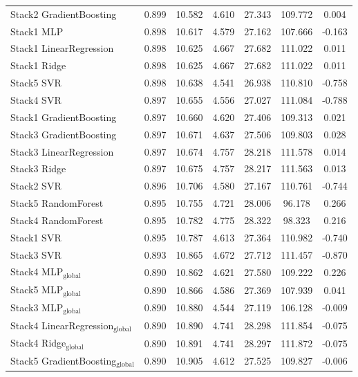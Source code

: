 \begin{table}[tp]
{\begin{tabular}{p{4.5cm}cccccc}
        Stack2 GradientBoosting & 0.899 & 10.582 & 4.610 & 27.343 & 109.772 & 0.004 \\
        Stack1 MLP & 0.898 & 10.617 & 4.579 & 27.162 & 107.666 & -0.163 \\
        Stack1 LinearRegression & 0.898 & 10.625 & 4.667 & 27.682 & 111.022 & 0.011 \\
        Stack1 Ridge & 0.898 & 10.625 & 4.667 & 27.682 & 111.022 & 0.011 \\
        Stack5 SVR & 0.898 & 10.638 & 4.541 & 26.938 & 110.810 & -0.758 \\
        Stack4 SVR & 0.897 & 10.655 & 4.556 & 27.027 & 111.084 & -0.788 \\
        Stack1 GradientBoosting & 0.897 & 10.660 & 4.620 & 27.406 & 109.313 & 0.021 \\
        Stack3 GradientBoosting & 0.897 & 10.671 & 4.637 & 27.506 & 109.803 & 0.028 \\
        Stack3 LinearRegression & 0.897 & 10.674 & 4.757 & 28.218 & 111.578 & 0.014 \\
        Stack3 Ridge & 0.897 & 10.675 & 4.757 & 28.217 & 111.563 & 0.013 \\
        Stack2 SVR & 0.896 & 10.706 & 4.580 & 27.167 & 110.761 & -0.744 \\
        Stack5 RandomForest & 0.895 & 10.755 & 4.721 & 28.006 & 96.178 & 0.266 \\
        Stack4 RandomForest & 0.895 & 10.782 & 4.775 & 28.322 & 98.323 & 0.216 \\
        Stack1 SVR & 0.895 & 10.787 & 4.613 & 27.364 & 110.982 & -0.740 \\
        Stack3 SVR & 0.893 & 10.865 & 4.672 & 27.712 & 111.457 & -0.870 \\
        Stack4 MLP$_{\text{global}}$ & 0.890 & 10.862 & 4.621 & 27.580 & 109.222 & 0.226 \\
        Stack5 MLP$_{\text{global}}$ & 0.890 & 10.866 & 4.586 & 27.369 & 107.939 & 0.041 \\
        Stack3 MLP$_{\text{global}}$ & 0.890 & 10.880 & 4.544 & 27.119 & 106.128 & -0.009 \\
        Stack4 LinearRegression$_{\text{global}}$ & 0.890 & 10.890 & 4.741 & 28.298 & 111.854 & -0.075 \\
        Stack4 Ridge$_{\text{global}}$ & 0.890 & 10.891 & 4.741 & 28.297 & 111.872 & -0.075 \\
        Stack5 GradientBoosting$_{\text{global}}$ & 0.890 & 10.905 & 4.612 & 27.525 & 109.827 & -0.006 \\

\end{tabular}}
\end{table}
